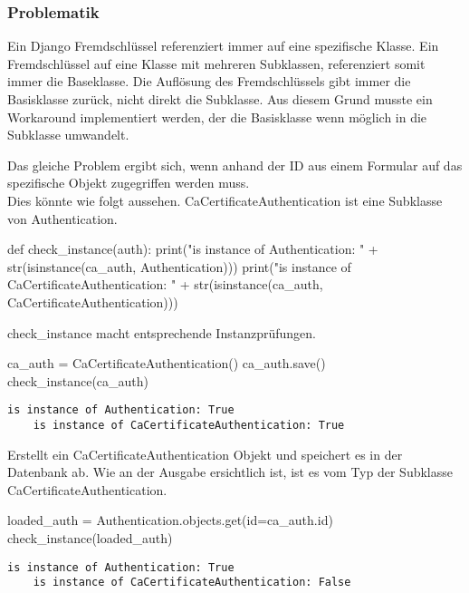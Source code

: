 \subsubsection{Problematik}
Ein Django Fremdschlüssel referenziert immer auf eine spezifische Klasse. Ein Fremdschlüssel auf eine Klasse mit mehreren Subklassen, referenziert somit immer die Baseklasse. Die Auflösung des Fremdschlüssels gibt immer die Basisklasse zurück, nicht direkt die Subklasse. Aus diesem Grund musste ein Workaround implementiert werden, der die Basisklasse wenn möglich in die Subklasse umwandelt.

Das gleiche Problem ergibt sich, wenn anhand der ID aus einem Formular auf das spezifische Objekt zugegriffen werden muss.
\\
Dies könnte wie folgt aussehen. CaCertificateAuthentication ist eine Subklasse von Authentication.
\medskip
\begin{python}
    def check_instance(auth):
        print("is instance of Authentication: " + 
            str(isinstance(ca_auth, Authentication)))
        print("is instance of CaCertificateAuthentication: " + 
            str(isinstance(ca_auth, CaCertificateAuthentication)))
\end{python}
check\_instance macht entsprechende Instanzprüfungen.\\

\begin{python}
    ca_auth = CaCertificateAuthentication()
    ca_auth.save()
    check_instance(ca_auth)
\end{python}

\begin{lstlisting}[style=BashInputStyle]
    is instance of Authentication: True
    is instance of CaCertificateAuthentication: True
\end{lstlisting}    
Erstellt ein  CaCertificateAuthentication Objekt und speichert es in der Datenbank ab. Wie an der Ausgabe ersichtlich ist, ist es vom Typ der Subklasse CaCertificateAuthentication.\\

\begin{python}
    loaded_auth = Authentication.objects.get(id=ca_auth.id)
    check_instance(loaded_auth)
\end{python}
\begin{lstlisting}[style=BashInputStyle]
    is instance of Authentication: True
    is instance of CaCertificateAuthentication: False
\end{lstlisting} 

